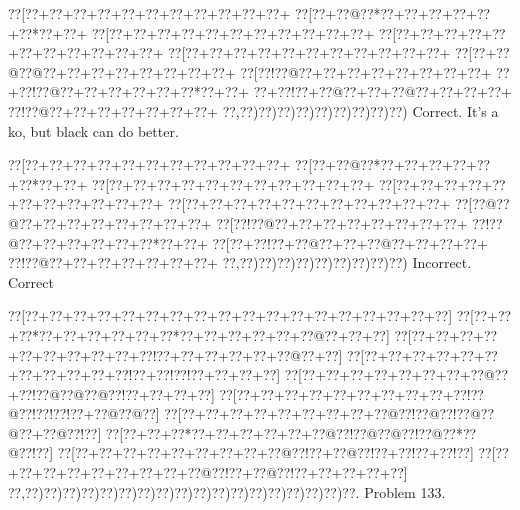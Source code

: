 \documentclass[a5paper]{article}
\begin{document}
\begin{center}
{\goo
\0??[\0??+\0??+\0??+\0??+\0??+\0??+\0??+\0??+\0??+\0??+\0??+
\0??[\0??+\0??@\0??*\0??+\0??+\0??+\0??+\0??+\0??*\0??+\0??+
\0??[\0??+\0??+\0??+\0??+\0??+\0??+\0??+\0??+\0??+\0??+\0??+
\0??[\0??+\0??+\0??+\0??+\0??+\0??+\0??+\0??+\0??+\0??+\0??+
\0??[\0??+\0??+\0??+\0??+\0??+\0??+\0??+\0??+\0??+\0??+\0??+
\0??[\0??+\0??@\0??@\0??+\0??+\0??+\0??+\0??+\0??+\0??+\0??+
\0??[\0??!\0??@\0??+\0??+\0??+\0??+\0??+\0??+\0??+\0??+
\0??+\0??!\0??@\0??+\0??+\0??+\0??+\0??+\0??*\0??+\0??+
\0??+\0??!\0??+\0??@\0??+\0??+\0??@\0??+\0??+\0??+\0??+
\0??!\0??@\0??+\0??+\0??+\0??+\0??+\0??+\0??+
\0??,\0??)\0??)\0??)\0??)\0??)\0??)\0??)\0??)\0??)
}
Correct. It's a ko, but black can do better.

\end{center}
\begin{center}
{\goo
\0??[\0??+\0??+\0??+\0??+\0??+\0??+\0??+\0??+\0??+\0??+\0??+
\0??[\0??+\0??@\0??*\0??+\0??+\0??+\0??+\0??+\0??*\0??+\0??+
\0??[\0??+\0??+\0??+\0??+\0??+\0??+\0??+\0??+\0??+\0??+\0??+
\0??[\0??+\0??+\0??+\0??+\0??+\0??+\0??+\0??+\0??+\0??+\0??+
\0??[\0??+\0??+\0??+\0??+\0??+\0??+\0??+\0??+\0??+\0??+\0??+
\0??[\0??@\0??@\0??+\0??+\0??+\0??+\0??+\0??+\0??+\0??+
\0??[\0??!\0??@\0??+\0??+\0??+\0??+\0??+\0??+\0??+\0??+
\0??!\0??@\0??+\0??+\0??+\0??+\0??+\0??*\0??+\0??+
\0??[\0??+\0??!\0??+\0??@\0??+\0??+\0??@\0??+\0??+\0??+\0??+
\0??!\0??@\0??+\0??+\0??+\0??+\0??+\0??+\0??+
\0??,\0??)\0??)\0??)\0??)\0??)\0??)\0??)\0??)\0??)
}
Incorrect. Correct

\end{center}
\newpage
\begin{center}
{\goo
\0??[\0??+\0??+\0??+\0??+\0??+\0??+\0??+\0??+\0??+\0??+\0??+\0??+\0??+\0??+\0??+\0??+\0??+\0??]
\0??[\0??+\0??+\0??*\0??+\0??+\0??+\0??+\0??+\0??*\0??+\0??+\0??+\0??+\0??+\0??@\0??+\0??+\0??]
\0??[\0??+\0??+\0??+\0??+\0??+\0??+\0??+\0??+\0??+\0??!\0??+\0??+\0??+\0??+\0??+\0??@\0??+\0??]
\0??[\0??+\0??+\0??+\0??+\0??+\0??+\0??+\0??+\0??+\0??+\0??!\0??+\0??!\0??!\0??+\0??+\0??+\0??]
\0??[\0??+\0??+\0??+\0??+\0??+\0??+\0??+\0??@\0??+\0??!\0??@\0??@\0??@\0??!\0??+\0??+\0??+\0??]
\0??[\0??+\0??+\0??+\0??+\0??+\0??+\0??+\0??+\0??+\0??!\0??@\0??!\0??!\0??!\0??+\0??@\0??@\0??]
\0??[\0??+\0??+\0??+\0??+\0??+\0??+\0??+\0??+\0??@\0??!\0??@\0??!\0??@\0??@\0??+\0??@\0??!\0??]
\0??[\0??+\0??+\0??*\0??+\0??+\0??+\0??+\0??+\0??@\0??!\0??@\0??@\0??!\0??@\0??*\0??@\0??!\0??]
\0??[\0??+\0??+\0??+\0??+\0??+\0??+\0??+\0??+\0??@\0??!\0??+\0??@\0??!\0??+\0??!\0??+\0??!\0??]
\0??[\0??+\0??+\0??+\0??+\0??+\0??+\0??+\0??+\0??@\0??!\0??+\0??@\0??!\0??+\0??+\0??+\0??+\0??]
\0??,\0??)\0??)\0??)\0??)\0??)\0??)\0??)\0??)\0??)\0??)\0??)\0??)\0??)\0??)\0??)\0??)\0??)\0??.
}
Problem 133.

\end{center}
\end{document}
